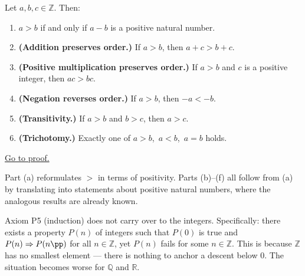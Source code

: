 \begin{lemma}
\label{lem:int-order}
Let $a, b, c \in \mathbb{Z}$. Then:
\begin{enumerate}
  \item[(a)] $a > b$ if and only if $a - b$ is a positive natural number.
  \item[(b)] \textbf{(Addition preserves order.)} If $a > b$, then $a + c > b + c$.
  \item[(c)] \textbf{(Positive multiplication preserves order.)}
    If $a > b$ and $c$ is a positive integer, then $ac > bc$.
  \item[(d)] \textbf{(Negation reverses order.)} If $a > b$, then $-a < -b$.
  \item[(e)] \textbf{(Transitivity.)} If $a > b$ and $b > c$, then $a > c$.
  \item[(f)] \textbf{(Trichotomy.)} Exactly one of $a > b$,\ $a < b$,\ $a = b$ holds.
\end{enumerate}
\hyperref[prf:int-order]{Go to proof.}
\end{lemma}

\begin{remark*}
Part (a) reformulates $>$ in terms of positivity.
Parts (b)--(f) all follow from (a) by translating into statements about
positive natural numbers, where the analogous results are already known.
\end{remark*}

\begin{remark*}
Axiom P5 (induction) does not carry over to the integers.
Specifically: there exists a property $P(n)$ of integers such that
$P(0)$ is true and $P(n) \Rightarrow P(n\pp)$ for all $n \in \mathbb{Z}$,
yet $P(n)$ fails for some $n \in \mathbb{Z}$.
This is because $\mathbb{Z}$ has no smallest element — there is nothing
to anchor a descent below $0$.
The situation becomes worse for $\mathbb{Q}$ and $\mathbb{R}$.
\end{remark*}

